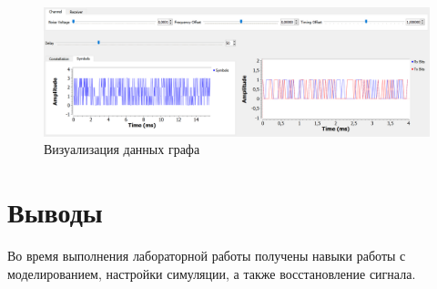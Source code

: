 \documentclass[a4paper,12pt]{report}
\begin{document}
 \begin{figure}[H]
        \centering
        \includegraphics[width=1.0\textwidth]{lab12_fig7_2.png}
        \caption{Визуализация данных графа}
        \label{fig:lab12_fig7_2}
\end{figure}

\chapter{Выводы}

Во время выполнения лабораторной работы получены навыки работы с моделированием, настройки симуляции, а также восстановление сигнала.
\end{document}
